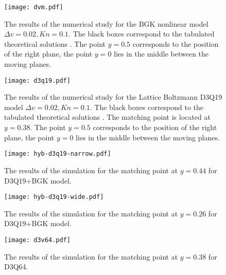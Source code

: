 \documentclass[]{elsarticle} %
\begin{document}
{\begin{figure}[!h]
\centering
\texttt{[image: dvm.pdf]}
\caption{The  results of the  numerical study for the BGK nonlinear model $\Delta v=0.02, Kn=0.1$. The  black boxes correspond  to the  tabulated theoretical solutions \cite{Luo2015, Luo2016}. The  point $y=0.5$ corresponds  to the position of the right plane, the point $y=0$ lies in the middle between the moving planes.}
\end{figure}


\begin{figure}[!h]
\centering
\texttt{[image: d3q19.pdf]}
\caption{The  results of the  numerical study for the Lattice Boltzmann D3Q19 model $\Delta v=0.02, Kn=0.1$. The  black boxes correspond  to the  tabulated theoretical solutions \cite{Luo2015, Luo2016}.  The  matching  point is  located at $y=0.38$. The  point $y=0.5$ corresponds  to the position of the right plane, the point $y=0$ lies in the middle between the moving planes.}
\end{figure}

\begin{figure}[!h]
\centering
\texttt{[image: hyb-d3q19-narrow.pdf]}
\caption{The  results of the simulation for the matching point at $y=0.44$ for D3Q19+BGK model.}
\end{figure}

\begin{figure}[!h]
\centering
\texttt{[image: hyb-d3q19-wide.pdf]}
\caption{The  results of the simulation for the matching point at $y=0.26$ for D3Q19+BGK model.}
\end{figure}


\begin{figure}[!h]
\centering
\texttt{[image: d3v64.pdf]}
\caption{The  results of the simulation for the matching point at $y=0.38$ for D3Q64.}
\end{figure}


}
\end{document}
